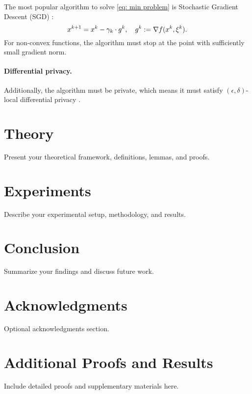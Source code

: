 \documentclass{article}
\newcommand{\algname}[1]{{\sf  #1}\xspace}
\begin{document}
The most popular algorithm to solve \eqref{eq: min problem} is Stochastic Gradient Descent (\algname{SGD}) 
 \parencite{Robbins1951}:
\begin{equation}
    x^{k+1} = x^k - \gamma_k \cdot  g^k, \quad g^k := \nabla f (x^k, \xi^k). \notag \label{eq: sgd intro}
\end{equation}
For non-convex functions, the algorithm must stop at the point with sufficiently small gradient norm.


\paragraph{Differential privacy.}
Additionally, the algorithm must be private, which means it must satisfy $(\epsilon,\delta)$-local differential privacy \cite{Dwork2014}.

\section{Theory}
Present your theoretical framework, definitions, lemmas, and proofs.

\section{Experiments}
Describe your experimental setup, methodology, and results.

\section{Conclusion}
Summarize your findings and discuss future work.

\section{Acknowledgments}
Optional acknowledgments section.

\appendix
\section{Additional Proofs and Results}
Include detailed proofs and supplementary materials here.

\printbibliography
\end{document}
